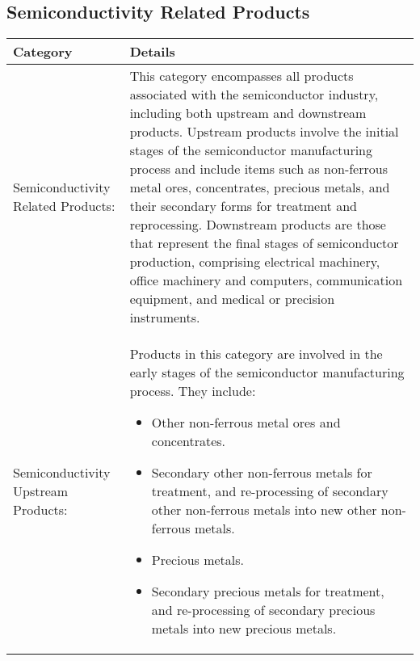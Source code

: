 \begin{appendices}


\section{Semiconductivity Related Products}
\noindent
\label{appendixA}
\begin{longtable}{|>{\raggedright\arraybackslash}p{6cm}|>{\raggedright\arraybackslash}p{8cm}|}
    \hline
    \textbf{Category} & \textbf{Details} \\
    \hline
    \endhead %
    Semiconductivity Related Products: & This category encompasses all products associated with the semiconductor industry, including both upstream and downstream products. Upstream products involve the initial stages of the semiconductor manufacturing process and include items such as non-ferrous metal ores, concentrates, precious metals, and their secondary forms for treatment and reprocessing. Downstream products are those that represent the final stages of semiconductor production, comprising electrical machinery, office machinery and computers, communication equipment, and medical or precision instruments. \\
    \hline
    Semiconductivity Upstream Products: & Products in this category are involved in the early stages of the semiconductor manufacturing process. They include:
    \begin{itemize}
        \item Other non-ferrous metal ores and concentrates.
        \item Secondary other non-ferrous metals for treatment, and re-processing of secondary other non-ferrous metals into new other non-ferrous metals.
        \item Precious metals.
        \item Secondary precious metals for treatment, and re-processing of secondary precious metals into new precious metals.

\end{itemize}
\end{longtable}
\end{appendices}
